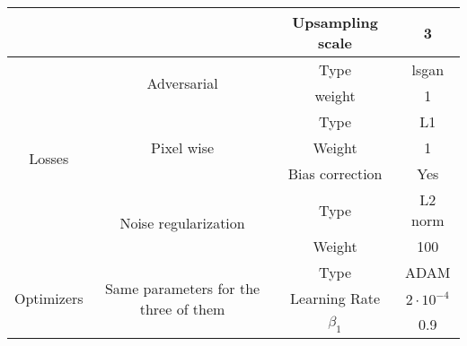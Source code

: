 \begin{table}[H]
{\begin{tabular}{|ccc|cc|}
    \multicolumn{3}{|c|}{}                                                                                                                  & Upsampling scale             & 3                  \\ \hline
    \multicolumn{1}{|c|}{\multirow{7}{*}{Losses}}             & \multicolumn{2}{c|}{\multirow{2}{*}{Adversarial}}                           & Type                         & lsgan              \\
    \multicolumn{1}{|c|}{}                                    & \multicolumn{2}{c|}{}                                                       & weight                       & 1                  \\ \cline{2-5} 
    \multicolumn{1}{|c|}{}                                    & \multicolumn{2}{c|}{\multirow{3}{*}{Pixel wise}}                            & Type                         & L1                 \\
    \multicolumn{1}{|c|}{}                                    & \multicolumn{2}{c|}{}                                                       & Weight                       & 1                  \\
    \multicolumn{1}{|c|}{}                                    & \multicolumn{2}{c|}{}                                                       & Bias correction              & Yes                \\ \cline{2-5} 
    \multicolumn{1}{|c|}{}                                    & \multicolumn{2}{c|}{\multirow{2}{*}{Noise regularization}}                  & Type                         & L2 norm            \\
    \multicolumn{1}{|c|}{}                                    & \multicolumn{2}{c|}{}                                                       & Weight                       & 100                \\ \hline
    \multicolumn{1}{|c|}{\multirow{5}{*}{Optimizers}}         & \multicolumn{2}{c|}{\multirow{5}{*}{Same parameters for the three of them}} & Type                         & ADAM               \\
    \multicolumn{1}{|c|}{}                                    & \multicolumn{2}{c|}{}                                                       & Learning Rate                & $2 \cdot 10^{-4}$  \\
    \multicolumn{1}{|c|}{}                                    & \multicolumn{2}{c|}{}                                                       & $\beta_1$                    & 0.9                \\

\end{tabular}}
\end{table}
